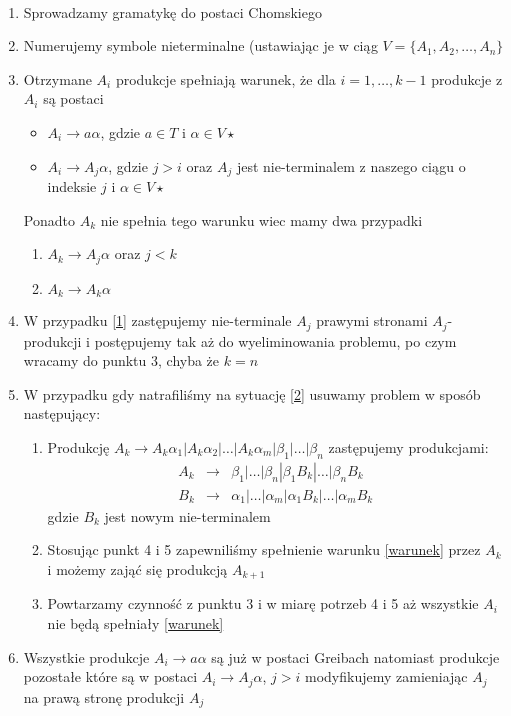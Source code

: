 	\begin{alg}~\\
		\begin{enumerate}
			\item Sprowadzamy gramatykę do postaci Chomskiego
			\item Numerujemy symbole nieterminalne (ustawiając je w ciąg $V = \{A_1, A_2, \dots, A_n\}$
			\item Otrzymane $A_i$ produkcje spełniają warunek, że dla $i=1,\dots, k-1$ produkcje z $A_i$ są postaci
				\begin{itemize}\label{warunek}
					\item $A_i \rightarrow a\alpha$, gdzie $a\in T$ i $\alpha\in V\star$
					\item $A_i \rightarrow A_j\alpha$, gdzie $j > i$ 
					oraz $A_j$ jest nie-terminalem z naszego ciągu o indeksie $j$ i $\alpha \in V\star$
				\end{itemize}
			Ponadto $A_k$ nie spełnia tego warunku wiec mamy dwa przypadki
				\begin{enumerate}
					\item $A_k \rightarrow A_j\alpha$ oraz $j < k$\label{1}
					\item $A_k \rightarrow A_k\alpha$\label{2}
				\end{enumerate}
			\item W przypadku \ref{1} zastępujemy nie-terminale $A_j$ prawymi stronami $A_j$-produkcji
			i postępujemy tak aż do wyeliminowania problemu, po czym wracamy do punktu 3, chyba że $k = n$
			\item W przypadku gdy natrafiliśmy na sytuację \ref{2} usuwamy problem w sposób następujący:
				\begin{enumerate}
					\item Produkcję $A_k \rightarrow A_k\alpha_1|A_k\alpha_2|\dots|A_k\alpha_m|\beta_1|\dots|\beta_n$
					zastępujemy produkcjami:
					\begin{eqnarray}
						A_k &\rightarrow& \beta_1|\dots|\beta_n|\beta_1B_k|\dots|\beta_nB_k \\
						B_k &\rightarrow& \alpha_1|\dots|\alpha_m|\alpha_1B_k|\dots|\alpha_mB_k									
					\end{eqnarray}
					gdzie $B_k$ jest nowym nie-terminalem
					\item Stosując punkt 4 i 5 zapewniliśmy spełnienie warunku \ref{warunek} przez $A_k$ i możemy zająć się produkcją $A_{k+1}$
					\item Powtarzamy czynność z punktu 3 i w miarę potrzeb 4 i 5 aż wszystkie $A_i$ nie będą spełniały \ref{warunek}
				\end{enumerate}
			\item Wszystkie produkcje $A_i \rightarrow a\alpha$ są już w postaci Greibach natomiast produkcje pozostałe które są w postaci
			$A_i\rightarrow A_j\alpha$, $j > i$ modyfikujemy zamieniając $A_j$ na prawą stronę produkcji $A_j$
		\end{enumerate}
	\end{alg}
	
